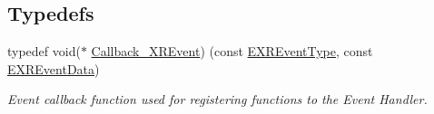 \subsection*{Typedefs}
\begin{DoxyCompactItemize}
\item 
typedef void($\ast$ \mbox{\hyperlink{namespace_open_x_r_provider_a658d364c78f8aa6deb33009e9c4ac0b8}{Callback\+\_\+\+X\+R\+Event}}) (const \mbox{\hyperlink{namespace_open_x_r_provider_aa80d286c249d35071f2ff4d19d9dc4c3}{E\+X\+R\+Event\+Type}}, const \mbox{\hyperlink{namespace_open_x_r_provider_a45de367abcea927b192e21d1c8b9853d}{E\+X\+R\+Event\+Data}})
\begin{DoxyCompactList}\small\item\em Event callback function used for registering functions to the Event Handler. \end{DoxyCompactList}\end{DoxyCompactItemize}
